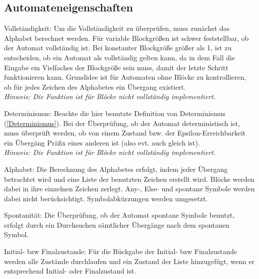 \subsection{Automateneigenschaften}
Vollständigkeit: Um die Vollständigkeit zu überprüfen, muss zunächst das Alphabet berechnet werden. Für variable Blockgrößen ist schwer feststellbar, ob der Automat vollständig ist. Bei konstanter Blockgröße größer als 1, ist zu entscheiden, ob ein Automat als vollständig gelten kann, da in dem Fall die Eingabe ein Vielfaches der Blockgröße sein muss, damit der letzte Schritt funktionieren kann. Grundidee ist für Automaten ohne Blöcke zu kontrollieren, ob für jedes Zeichen des Alphabetes ein Übergang existiert.\\
\textit{Hinweis: Die Funktion ist für Blöcke nicht vollständig implementiert.}

Determinismus: Beachte die hier benutzte Definition von Determinismus (\ref{Determinismus}). Bei der Überprüfung, ob der Automat deterministisch ist, muss überprüft werden, ob von einem Zustand bzw. der Epsilon-Erreichbarkeit ein Übergäng Präfix eines anderen ist (also evt. auch gleich ist).\\
\textit{Hinweis: Die Funktion ist für Blöcke nicht vollständig implementiert.}

Alphabet: Die Berechnung des Alphabetes erfolgt, indem jeder Übergang betrachtet wird und eine Liste der benutzten Zeichen erstellt wird. Blöcke werden dabei in ihre einzelnen Zeichen zerlegt. Any-, Else- und spontane Symbole werden dabei nicht berücksichtigt. Symbolabkürzungen werden umgesetzt.

Spontanität: Die Überprüfung, ob der Automat spontane Symbole benutzt, erfolgt durch ein Durchsuchen sämtlicher Übergänge nach dem spontanen Symbol.

Initial- bzw Finalzustande: Für die Rückgabe der Initial- bzw Finalzustande werden alle Zustände durchlaufen und ein Zustand der Liste hinzugefügt, wenn er entsprechend Initial- oder Finalzustand ist.
\endinput
